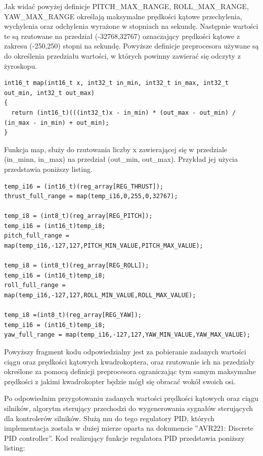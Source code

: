 Jak widać powyżej definicje PITCH\_MAX\_RANGE, ROLL\_MAX\_RANGE, YAW\_MAX\_RANGE określają maksymalne prędkości kątowe przechylenia, wychylenia oraz odchylenia wyrażone w stopniach na sekundę. Następnie wartości te są rzutowane na przedział (-32768,32767) oznaczający prędkości kątowe z zakresu (-250,250) stopni na sekundę. Powyższe definicje preprocesora używane są do określenia przedziału wartości, w których powinny zawierać się odczyty z żyroskopu.

\begin{lstlisting}
int16_t map(int16_t x, int32_t in_min, int32_t in_max, int32_t out_min, int32_t out_max)
{
  return (int16_t)(((int32_t)x - in_min) * (out_max - out_min) / (in_max - in_min) + out_min);
}
\end{lstlisting}

Funkcja map, służy do rzutowania liczby x zawierającej się w przedziale (in\_minn, in\_max) na przedział (out\_min, out\_max). Przykład jej użycia przedstawia poniższy listing.

\begin{lstlisting}
temp_i16 = (int16_t)(reg_array[REG_THRUST]);
thrust_full_range = map(temp_i16,0,255,0,32767);

temp_i8 = (int8_t)(reg_array[REG_PITCH]);
temp_i16 = (int16_t)temp_i8;
pitch_full_range = map(temp_i16,-127,127,PITCH_MIN_VALUE,PITCH_MAX_VALUE);

temp_i8 = (int8_t)(reg_array[REG_ROLL]);
temp_i16 = (int16_t)temp_i8;
roll_full_range = map(temp_i16,-127,127,ROLL_MIN_VALUE,ROLL_MAX_VALUE);

temp_i8 =(int8_t)(reg_array[REG_YAW]);
temp_i16 = (int16_t)temp_i8;
yaw_full_range = map(temp_i16,-127,127,YAW_MIN_VALUE,YAW_MAX_VALUE);
\end{lstlisting}

Powyższy fragment kodu odpowiedzialny jest za pobieranie zadanych wartości ciągu oraz prędkości kątowych kwadrokoptera, oraz rzutowanie ich na przedziały określone za pomocą definicji preprocesora ograniczając tym samym maksymalne prędkości z jakimi kwadrokopter będzie mógł się obracać wokół swoich osi.

Po odpowiednim przygotowaniu zadanych wartości prędkości kątowych oraz ciągu silników, algorytm sterujący przechodzi do wygenerowania sygnałów sterujących dla kontrolerów silników. Służą mu do tego regulatory PID, których implementacja została w dużej mierze oparta na dokumencie ''AVR221: Discrete PID controller''. Kod realizujący funkcje regulatora PID przedstawia poniższy listing:

